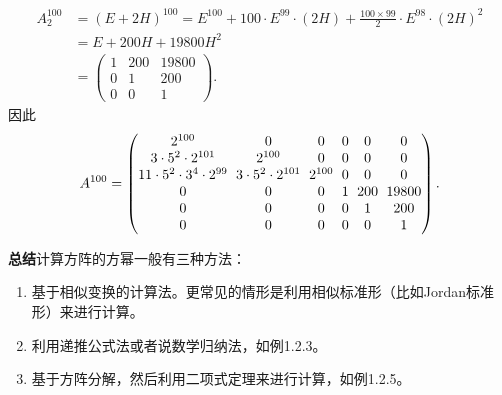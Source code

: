 \begin{align*}
A_2^{100}
&=(E+2H)^{100}
 =E^{100}+100\cdot E^{99}\cdot(2H)
 +\frac{100\times99}{2}\cdot E^{98}\cdot(2H)^2\\
&=E+200H+19800H^2\\
&=\begin{pmatrix}1&200&19800\\0&1&200\\0&0&1\end{pmatrix}.
\end{align*}
因此
\[
\setlength{\arraycolsep}{3pt}
A^{100}=\begin{pmatrix}
2^{100}&0&0&0&0&0\\
3\cdot5^2\cdot2^{101}&2^{100}&0&0&0&0\\
11\cdot5^2\cdot3^4\cdot2^{99}&3\cdot5^2\cdot2^{101}&2^{100}&0&0&0\\
0&0&0&1&200&19800\\
0&0&0&0&1&200\\
0&0&0&0&0&1
\end{pmatrix}.
\]

\par\medskip\noindent\textbf{总结}\quad 计算方阵的方幂一般有三种方法：
\begin{enumerate}[label=（\arabic*）]
\item 基于相似变换的计算法。更常见的情形是利用相似标准形（比如Jordan标准形）来进行计算。
\item 利用递推公式法或者说数学归纳法，如例1.2.3。
\item 基于方阵分解，然后利用二项式定理来进行计算，如例1.2.5。
\end{enumerate}
